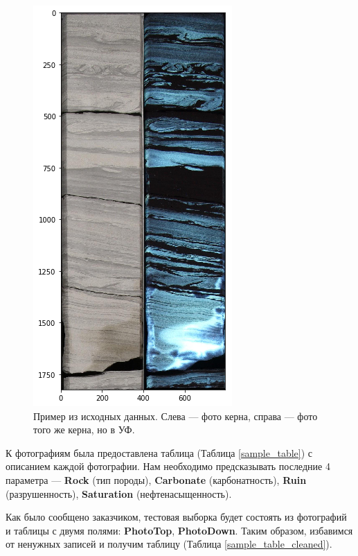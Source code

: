 \documentclass[14pt]{matmex-diploma}
\begin{document}
    \begin{figure}[h]
        \centering
        \includegraphics[scale=0.4]{images/sample.png}
        \caption{Пример из исходных данных. Слева — фото керна, справа — фото того же керна, но в УФ.}
        \label{sample}
    \end{figure}       
    
    К фотографиям была предоставлена таблица (Таблица \ref{sample_table}) с описанием каждой фотографии. Нам необходимо предсказывать последние 4 параметра — \textbf{Rock} (тип породы), \textbf{Carbonate} (карбонатность), \textbf{Ruin} (разрушенность), \textbf{Saturation} (нефтенасыщенность). 
        
    Как было сообщено заказчиком, тестовая выборка будет состоять из фотографий и таблицы с двумя полями: \textbf{PhotoTop}, \textbf{PhotoDown}. Таким образом, избавимся от ненужных записей и получим таблицу (Таблица \ref{sample_table_cleaned}).
    
\end{document}
